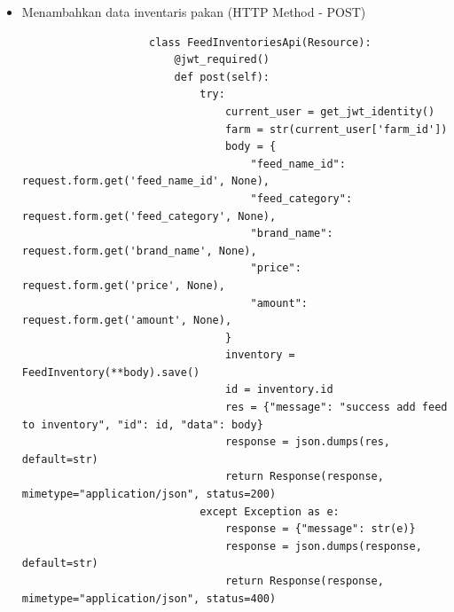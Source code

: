 \begin{spacing}{1.5}
\begin{enumerate}
\begin{enumerate}
\begin{itemize}
				\begin{lstlisting}
					class FeedInventoryApi(Resource):
						def get(self, id):
							try:
								pipeline = [
									{"$match": {"id_int": int(id)}},
									{'$lookup': {
										'from': 'feed_name',
										'let': {"feednameid": "$feed_name_id"},
										'pipeline': [
											{'$match': {'$expr': {'$eq': ['$_id', '$$feednameid']}}},
											{"$project": {
												"_id": 1,
												"id_int": 1,
												"type": 1,
												"name": 1,
												"description": 1,
												"producer": 1,
												"protein": 1,
												"carbohydrate": 1,
												"min_expired_period": 1,
												"max_expired_period": 1,
												"image": 1,
												"created_at": 1,
											}}
										],
										'as': 'feed'
									}},
									{"$addFields": {
										"feed": {"$first": "$feed"},
									}},
								]
						
								testing = FeedInventory.objects.aggregate(pipeline)
								temp = list(testing)
								if len(temp) == 0:
									res = {"message": 'no data found'}
									response = json.dumps(res, default=str)
									return Response(response, mimetype="application/json", status=200)
								response = json.dumps({
									'status': 'success',
									'data': temp[0],
								}, default=str)
								return Response(response, mimetype="application/json", status=200)
							except Exception as e:
								response = {"message": e}
								response = json.dumps(response, default=str)
								return Response(response, mimetype="application/json", status=400)
				\end{lstlisting}

				\item Menambahkan data inventaris pakan (HTTP Method - POST)
				
				\begin{lstlisting}
					class FeedInventoriesApi(Resource):
						@jwt_required()
						def post(self):
							try:
								current_user = get_jwt_identity()
								farm = str(current_user['farm_id'])
								body = {
									"feed_name_id": request.form.get('feed_name_id', None),
									"feed_category": request.form.get('feed_category', None),
									"brand_name": request.form.get('brand_name', None),
									"price": request.form.get('price', None),
									"amount": request.form.get('amount', None),
								}
								inventory = FeedInventory(**body).save()
								id = inventory.id
								res = {"message": "success add feed to inventory", "id": id, "data": body}
								response = json.dumps(res, default=str)
								return Response(response, mimetype="application/json", status=200)
							except Exception as e:
								response = {"message": str(e)}
								response = json.dumps(response, default=str)
								return Response(response, mimetype="application/json", status=400)
				\end{lstlisting}


\end{itemize}
\end{enumerate}
\end{enumerate}
\end{spacing}
